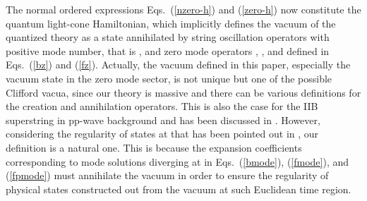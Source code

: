 \documentclass[a4paper,12pt]{article}
\begin{document}
The normal ordered expressions Eqs.~(\ref{nzero-h}) and (\ref{zero-h})
now constitute the quantum light-cone Hamiltonian, which implicitly
defines the vacuum \myHighlight{$|0 \rangle$}\coordHE{} of the quantized theory as a state
annihilated by string oscillation operators with positive mode number,
that is \coordHE{}, and zero mode operators \coordHE{}, \myHighlight{$\chi$}\coordHE{}, and \coordHE{}
defined in Eqs.~(\ref{bz}) and (\ref{fz}).  Actually, the vacuum
defined in this paper, especially the vacuum state in the zero mode
sector, is not unique but one of the possible Clifford vacua, since
our theory is massive and there can be various definitions for the
creation and annihilation operators.  This is also the case for the
IIB superstring in pp-wave background and has been discussed in
\cite{met109}.  However, considering the regularity of states at \coordHE{} that has been pointed out in \cite{rus179}, our
definition is a natural one. This is because the expansion
coefficients corresponding to mode solutions diverging at \coordHE{} in Eqs.~(\ref{bmode}), (\ref{fmode}), and
(\ref{fpmode}) must annihilate the vacuum in order to ensure the
regularity of physical states constructed out from the vacuum at such
Euclidean time region.
\end{document}
